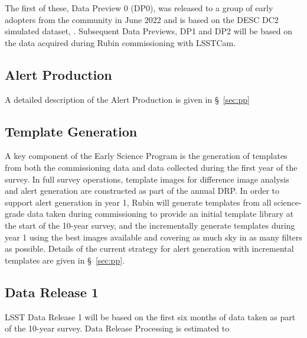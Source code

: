The first of these, Data Preview 0 (DP0), was released to a group of early adopters from the community in June 2022 and is based on the DESC DC2 simulated dataset, \citep{2021ApJS..253...31L}. 
Subsequent Data Previews, DP1 and DP2 will be based on the data acquired during Rubin commissioning with LSSTCam. 

\subsection{Alert Production} 

A detailed description of the Alert Production is given in \S~\ref{sec:pp}

\subsection {Template Generation}

A key component of the Early Science Program is the generation of templates from both the commissioning data and data collected during the first year of the survey.
In full survey operations, template images for difference image analysis and alert generation are constructed as part of the annual DRP.
In order to support alert generation in year 1, Rubin will generate templates from all science-grade data taken during commissioning to provide an initial template library at the start of the 10-year survey, and the incrementally generate templates during year 1 using the best images available and covering as much sky in as many filters as possible.
Details of the current strategy for alert generation  with incremental templates are given in  \S~\ref{sec:pp}.

\subsection{Data Release 1}

LSST Data Release 1 will be based on the first six months of data taken as part of the 10-year survey. 
Data Release Processing is estimated to 
